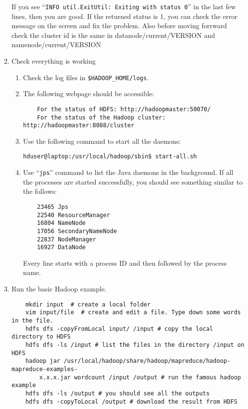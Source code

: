 \documentclass[11pt]{article}
\begin{document}
\begin{enumerate}
If you see ``{\tt INFO util.ExitUtil: Exiting with status 0}'' in the last few lines, then you are good. If the returned status is 1, you can check the error message on the screen and fix the problem.
Also before moving forrward check the cluster id is the same in datanode/current/VERSION and namenode/current/VERSION
\item  Check everything is working
\begin{enumerate}
\item Check the log files in {\tt \$HADOOP\_HOME/logs}.
\item The following webpage should be accessible:
\begin{verbatim}
    For the status of HDFS: http://hadoopmaster:50070/ 
    For the status of the Hadoop cluster: http://hadoopmaster:8088/cluster 
\end{verbatim}

\item Use the following command to start all the daemons:
\begin{verbatim}
hduser@laptop:/usr/local/hadoop/sbin$ start-all.sh
\end{verbatim}



\item Use ``{\tt jps}'' command to list the Java daemons in the background. If all the processes are started successfully, you should see something similar to the follows:
\begin{verbatim}
    23465 Jps
    22540 ResourceManager
    16804 NameNode
    17056 SecondaryNameNode
    22837 NodeManager
    16927 DataNode
\end{verbatim}
Every line starts with a process ID and then followed by the process name.
\end{enumerate}
\item Run the basic Hadoop example.
\vspace{-.15in}\begin{verbatim}
    mkdir input  # create a local folder
    vim input/file  # create and edit a file. Type down some words in the file.
    hdfs dfs -copyFromLocal input/ /input # copy the local directory to HDFS
    hdfs dfs -ls /input # list the files in the directory /input on HDFS
    hadoop jar /usr/local/hadoop/share/hadoop/mapreduce/hadoop-mapreduce-examples-
        x.x.x.jar wordcount /input /output # run the famous hadoop example
    hdfs dfs -ls /output # you should see all the outputs
    hdfs dfs -copyToLocal /output # download the result from HDFS
\end{verbatim}\vspace{-.15in}


\end{enumerate}
\end{document}
